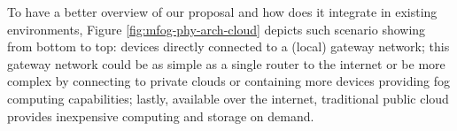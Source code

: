 
To have a better overview of our proposal and how does it integrate in existing
\iot environments, Figure \ref{fig:mfog-phy-arch-cloud} depicts such scenario
showing from bottom to top:
\iot devices directly connected to a (local) gateway network;
this gateway network could be as simple as a single router to the internet
or be more complex by connecting to private clouds or 
containing more devices providing fog computing capabilities;
lastly, available over the internet, traditional public cloud provides
inexpensive computing and storage on demand.

